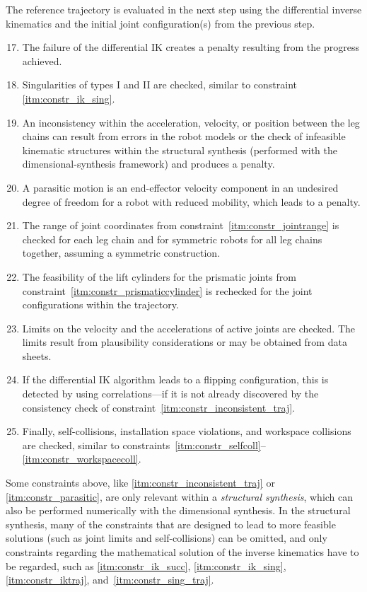 %
The reference trajectory is evaluated in the next step using the differential inverse kinematics and the initial joint configuration(s) from the previous step.
%
\begin{enumerate}
  \setcounter{enumi}{16}
  \item \label{itm:constr_iktraj} The failure of the differential IK creates a penalty resulting from the progress achieved.
  \item \label{itm:constr_sing_traj} Singularities of types I and II are checked, similar to constraint \ref*{itm:constr_ik_sing}.
  \item \label{itm:constr_inconsistent_traj} An inconsistency within the acceleration, velocity, or position between the leg chains can result from errors in the robot models or the check of infeasible kinematic structures within the structural synthesis (performed with the dimensional-synthesis framework) and produces a penalty.
  \item \label{itm:constr_parasitic} A parasitic motion is an end-effector velocity component in an undesired degree of freedom for a robot with reduced mobility, which leads to a penalty.
  \item \label{itm:constr_jointrange_traj} The range of joint coordinates from constraint~\ref*{itm:constr_jointrange} is checked for each leg chain and for symmetric robots for all leg chains together, assuming a symmetric construction.
  \item \label{itm:constr_prismaticcylinder_traj} The feasibility of the lift cylinders for the prismatic joints from constraint~\ref*{itm:constr_prismaticcylinder} is rechecked for the joint configurations within the trajectory.
  \item \label{itm:constr_velo} Limits on the velocity and the accelerations of active joints are checked. The limits result from plausibility considerations or may be obtained from data sheets.
  \item \label{itm:constr_jump} If the differential IK algorithm leads to a flipping configuration, this is detected by using correlations---if it is not already discovered by the consistency check of constraint~\ref*{itm:constr_inconsistent_traj}.
  \item \label{itm:constr_collinstspc_traj} Finally, self-collisions, installation space violations, and workspace collisions are checked, similar to constraints~\ref*{itm:constr_selfcoll}--\ref*{itm:constr_workspacecoll}.
\end{enumerate}
%
Some %
%
constraints above, like \ref*{itm:constr_inconsistent_traj} or \ref*{itm:constr_parasitic}, are only relevant within a \emph{structural synthesis}, which can also be performed numerically with the dimensional synthesis. %
%
In the structural synthesis, many of the constraints that are designed to lead to more feasible solutions (such as joint limits and self-collisions) can be omitted, and only constraints regarding the mathematical solution of the inverse kinematics have to be regarded, such as \ref*{itm:constr_ik_succ}, \ref*{itm:constr_ik_sing}, \ref*{itm:constr_iktraj}, and~\ref*{itm:constr_sing_traj}.


